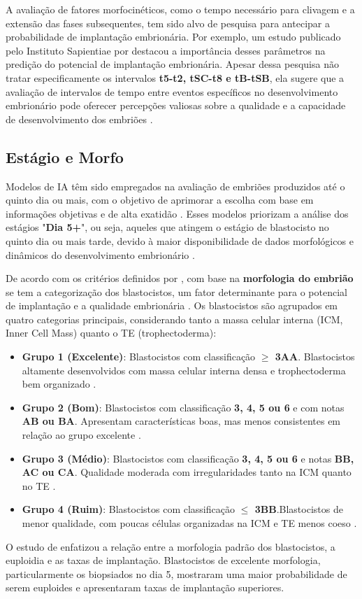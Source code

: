 A avaliação de fatores morfocinéticos, como o tempo necessário para clivagem e a extensão das fases subsequentes, tem sido alvo de pesquisa para antecipar a probabilidade de implantação embrionária. Por exemplo, um estudo publicado pelo Instituto Sapientiae por  destacou a importância desses parâmetros na predição do potencial de implantação embrionária. Apesar dessa pesquisa não tratar especificamente os intervalos \textbf{t5-t2, tSC-t8 e tB-tSB}, ela sugere que a avaliação de intervalos de tempo entre eventos específicos no desenvolvimento embrionário pode oferecer percepções valiosas sobre a qualidade e a capacidade de desenvolvimento dos embriões \cite{desai2019}.

\subsection{Estágio e Morfo}

Modelos de IA têm sido empregados na avaliação de embriões produzidos até o quinto dia ou mais, com o objetivo de aprimorar a escolha com base em informações objetivas e de alta exatidão \cite{lassen2022}. Esses modelos priorizam a análise dos estágios "\textbf{Dia 5+}", ou seja, aqueles que atingem o estágio de blastocisto no quinto dia ou mais tarde, devido à maior disponibilidade de dados morfológicos e dinâmicos do desenvolvimento embrionário \cite{lassen2022}. 

De acordo com os critérios definidos por , com base na \textbf{morfologia do embrião} se tem a categorização dos blastocistos, um fator determinante para o potencial de implantação e a qualidade embrionária \cite{capalbo2014}. Os blastocistos são agrupados em quatro categorias principais, considerando tanto a massa celular interna (ICM, Inner Cell Mass) quanto o TE (trophectoderma):
\begin{itemize}
  \item \textbf{Grupo 1 (Excelente)}: Blastocistos com classificação  \textbf{$\geq$ 3AA}. Blastocistos altamente desenvolvidos com massa celular interna densa e trophectoderma bem organizado \cite{capalbo2014}.
  \item \textbf{Grupo 2 (Bom)}: Blastocistos com classificação \textbf{3, 4, 5 ou 6} e com notas \textbf{AB ou BA}. Apresentam características boas, mas menos consistentes em relação ao grupo excelente \cite{capalbo2014}.
  \item \textbf{Grupo 3 (Médio)}: Blastocistos com classificação \textbf{3, 4, 5 ou 6} e notas \textbf{BB, AC ou CA}. Qualidade moderada com irregularidades tanto na ICM quanto no TE \cite{capalbo2014}.
  \item \textbf{Grupo 4 (Ruim)}: Blastocistos com classificação \textbf{$\leq$ 3BB}.Blastocistos de menor qualidade, com poucas células organizadas na ICM e TE menos coeso \cite{capalbo2014}.
\end{itemize}
O estudo de  enfatizou a relação entre a morfologia padrão dos blastocistos, a euploidia e as taxas de implantação. Blastocistos de excelente morfologia, particularmente os biopsiados no dia 5, mostraram uma maior probabilidade de serem euploides e apresentaram taxas de implantação superiores.

